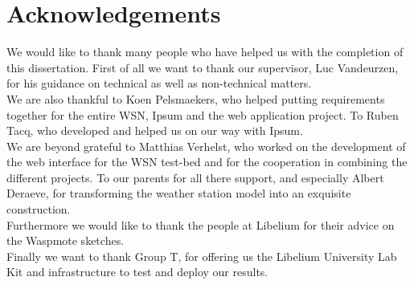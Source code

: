 \section{Acknowledgements}
We would like to thank many people who have helped us with the completion of this dissertation. First of all we want to thank our supervisor, Luc Vandeurzen, for his guidance on technical as well as non-technical matters.\\
We are also thankful to Koen Pelsmaekers, who helped putting requirements together for the entire WSN, Ipsum and the web application project. To Ruben Tacq, who developed and helped us on our way with Ipsum.\\
We are beyond grateful to Matthias Verhelst, who worked on the development of the web interface for the WSN test-bed and for the cooperation in combining the different projects. To our parents for all there support, and especially Albert Deraeve, for transforming the weather station model into an exquisite construction.\\
Furthermore we would like to thank the people at Libelium for their advice on the Waspmote sketches.\\
Finally we want to thank Group T, for offering us the Libelium University Lab Kit and infrastructure to test and deploy our results. 